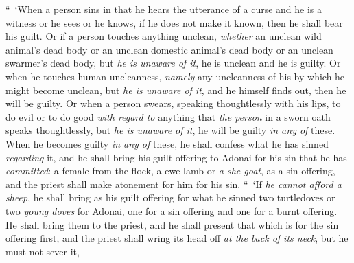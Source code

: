 \begin{biblechapter} %
 “ ‘When a person sins in that he hears the utterance of a curse and he is a witness or he sees or he knows, if he does not make it known, then he shall bear his guilt.
\verse Or if a person touches anything unclean, \textit{whether} an unclean wild animal’s dead body or an unclean domestic animal’s dead body or an unclean swarmer’s dead body, but \textit{he is unaware of it}, he is unclean and he is guilty.
\verse Or when he touches human uncleanness, \textit{namely} any uncleanness of his by which he might become unclean, but \textit{he is unaware of it}, and he himself finds out, then he will be guilty.
\verse Or when a person swears, speaking thoughtlessly with his lips, to do evil or to do good \textit{with regard to} anything that \textit{the person} in a sworn oath speaks thoughtlessly, but \textit{he is unaware of it}, he will be guilty \textit{in any of} these.
\verse When he becomes guilty \textit{in any of} these, he shall confess what he has sinned \textit{regarding} it,
\verse and he shall bring his guilt offering to Adonai for his sin that he has \textit{committed}: a female from the flock, a ewe-lamb or \textit{a she-goat}, as a sin offering, and the priest shall make atonement for him for his sin.
\verse “ ‘If \textit{he cannot afford a sheep}, he shall bring as his guilt offering for what he sinned two turtledoves or two \textit{young doves} for Adonai, one for a sin offering and one for a burnt offering.
\verse He shall bring them to the priest, and he shall present that which is for the sin offering first, and the priest shall wring its head off \textit{at the back of its neck}, but he must not sever it,

\end{biblechapter}
